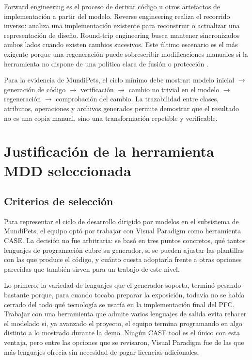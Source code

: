 \documentclass[journal,onecolumn]{IEEEtran}
\begin{document}
	Forward engineering es el proceso de derivar código u otros artefactos de implementación a partir del modelo. Reverse engineering realiza el recorrido inverso: analiza una implementación existente para reconstruir o actualizar una representación de diseño. Round-trip engineering busca mantener sincronizados ambos lados cuando existen cambios sucesivos. Este último escenario es el más exigente porque una regeneración puede sobrescribir modificaciones manuales si la herramienta no dispone de una política clara de fusión o protección \cite{almutairi2022roundtrip}.
	
	Para la evidencia de MundiPets, el ciclo mínimo debe mostrar: modelo inicial \(\to\) generación de código \(\to\) verificación \(\to\) cambio no trivial en el modelo \(\to\) regeneración \(\to\) comprobación del cambio. La trazabilidad entre clases, atributos, operaciones y archivos generados permite demostrar que el resultado no es una copia manual, sino una transformación repetible y verificable.
	
	\section{Justificación de la herramienta MDD seleccionada}
	
	\subsection{Criterios de selección}
	
	Para representar el ciclo de desarrollo dirigido por modelos en el subsistema de MundiPets, el equipo optó por trabajar con Visual Paradigm como herramienta CASE. La decisión no fue arbitraria: se basó en tres puntos concretos, qué tantos lenguajes de programación cubre su generador, si se pueden ajustar las plantillas con las que produce el código, y cuánto cuesta adoptarla frente a otras opciones parecidas que también sirven para un trabajo de este nivel.
	
	Lo primero, la variedad de lenguajes que el generador soporta, terminó pesando bastante porque, para cuando tocaba preparar la exposición, todavía no se había cerrado del todo qué tecnología se usaría en la implementación final del PFC. Trabajar con una herramienta que admite varios lenguajes de salida evita rehacer el modelado si, ya avanzado el proyecto, el equipo termina programando en algo distinto a lo mostrado durante la demo. Ningún CASE tool es el único con esta ventaja, pero entre las opciones que se revisaron, Visual Paradigm fue de las que más lenguajes ofrecía sin necesidad de pagar licencias adicionales.
	
\end{document}
